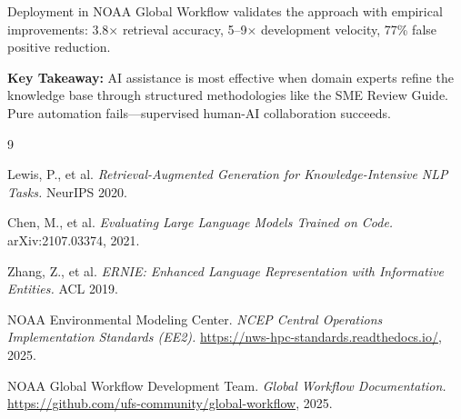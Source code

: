 \documentclass[11pt,letterpaper]{article}
\begin{document}
Deployment in NOAA Global Workflow validates the approach with empirical improvements: 3.8$\times$ retrieval accuracy, 5--9$\times$ development velocity, 77\% false positive reduction.

\textbf{Key Takeaway:} AI assistance is most effective when domain experts refine the knowledge base through structured methodologies like the SME Review Guide. Pure automation fails---supervised human-AI collaboration succeeds.

\begin{thebibliography}{9}

Lewis, P., et al.
\textit{Retrieval-Augmented Generation for Knowledge-Intensive NLP Tasks.}
NeurIPS 2020.

Chen, M., et al.
\textit{Evaluating Large Language Models Trained on Code.}
arXiv:2107.03374, 2021.

Zhang, Z., et al.
\textit{ERNIE: Enhanced Language Representation with Informative Entities.}
ACL 2019.

NOAA Environmental Modeling Center.
\textit{NCEP Central Operations Implementation Standards (EE2).}
\url{https://nws-hpc-standards.readthedocs.io/}, 2025.

NOAA Global Workflow Development Team.
\textit{Global Workflow Documentation.}
\url{https://github.com/ufs-community/global-workflow}, 2025.

\end{thebibliography}
\end{document}

